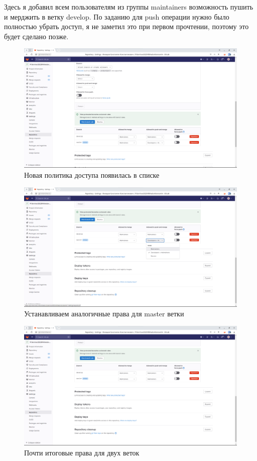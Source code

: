 \documentclass[a4paper]{article}
\begin{document}
  Здесь я добавил всем пользователям из группы maintainers возможность пушить и мерджить в ветку develop.
  По заданию для push операции нужно было полностью убрать доступ, я не заметил это при первом прочтении, поэтому это будет сделано позже.

  \begin{figure}[H]
    \centering
    \includegraphics[width=\textwidth]{1_ (39)}
    \caption{Новая политика доступа появилась в списке}
  \end{figure}

  \begin{figure}[H]
    \centering
    \includegraphics[width=\textwidth]{1_ (37)}
    \caption{Устанавливаем аналогичные права для master ветки}
  \end{figure}

  \begin{figure}[H]
    \centering
    \includegraphics[width=\textwidth]{1_ (36)}
    \caption{Почти итоговые права для двух веток}
  \end{figure}
\end{document}

